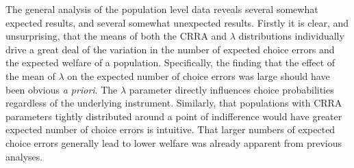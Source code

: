 \documentclass[../main.tex]{subfiles}
\begin{document}
%
%
%

The general analysis of the population level data reveals several somewhat expected results, and several somewhat unexpected results.
Firstly it is clear, and unsurprising, that the means of both the CRRA and $\lambda$ distributions individually drive a great deal of the variation in the number of expected choice errors and the expected welfare of a population.
Specifically, the finding that the effect of the mean of $\lambda$ on the expected number of choice errors was large should have been obvious \textit{a priori}.
The $\lambda$ parameter directly influences choice probabilities regardless of the underlying instrument.
Similarly, that populations with CRRA parameters tightly distributed around a point of indifference would have greater expected number of choice errors is intuitive.
That larger numbers of expected choice errors generally lead to lower welfare was already apparent from previous analyses.
\end{document}
